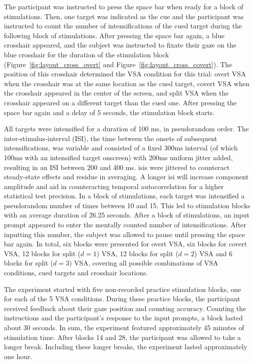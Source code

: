 The participant was instructed to press the space bar when ready for a block
of stimulations.
Then, one target was indicated as the cue and the participant
was instructed to count the number of intensifications of the cued target
during the following block of stimulations.
After pressing the space bar again, a blue crosshair appeared, and the subject
was instructed to fixate their gaze on the blue crosshair for the duration of
the stimulation block (Figure~\ref{fig:layout_cross_overt} and Figure~\ref{fig:layout_cross_covert}).
The position of this crosshair determined the VSA condition for this trial:
overt VSA when the crosshair was at the same location as the cued target,
covert VSA when the crosshair appeared in the center of the screen, and split
VSA when the crosshair appeared on a different target than the cued one.
After pressing the space bar again and a delay of 5 seconds, the stimulation block
starts.

All targets were intensified for a duration of 100 ms, in pseudorandom order.
The inter-stimulus-interval (ISI), the time between the onsets of subsequent intensifications,
was variable and consisted of a fixed 300ms interval (of which 100ms with an intensified target onscreen)
with 200ms uniform jitter added, resulting in an ISI
between 200 and 400 ms.
\Acp{isi} were jittered to counteract steady-state effects and residue in averaging. A
longer \ac{isi} will increase component amplitude and aid in counteracting temporal
autocorrelation for a higher statistical test precision.
In a block of stimulations, each target was intensified a pseudorandom number of times between 10 and 15.
This led to stimulation blocks with an average duration of 26.25 seconds. After a block of stimulations, an
input prompt appeared to enter the mentally counted number of intensifications.
After inputting this number, the subject was allowed to pause until pressing the space bar again.
In total, six blocks were presented for overt VSA, six blocks for covert VSA, 12 blocks for
split ($d=1$) VSA, 12 blocks for split ($d=2$) VSA and 6 blocks for split
($d=3$) VSA, covering all possible combinations of VSA conditions, cued targets and
crosshair locations.

The experiment started with five non-recorded practice stimulation blocks, one for
each of the 5 VSA conditions.
During these practice blocks, the participant received feedback about their gaze
position and counting accuracy.
Counting the instructions and the participant's response to the
input prompts, a block lasted about 30
seconds. In sum, the experiment featured approximately 45 minutes of
stimulation time.
After blocks 14 and 28, the participant was allowed to take a longer break.
Including these longer breaks, the experiment lasted approximately one hour.

